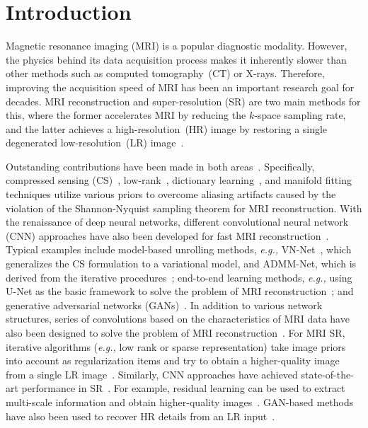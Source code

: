 \documentclass[runningheads]{llncs}
\newcommand{\eg}[1]{\textit{e.g.,}}
\begin{document}
\section{Introduction}
Magnetic resonance imaging (MRI) is a popular diagnostic modality. However, the physics behind its data acquisition process makes it inherently slower than other methods such as computed tomography\!~(CT) or X-rays. Therefore, improving the acquisition speed of MRI has been an important research goal for decades. MRI reconstruction and super-resolution (SR) are two main methods for this, where the former accelerates MRI by reducing the $k$-space sampling rate, and the latter achieves a high-resolution\!~(HR) image by restoring a single degenerated low-resolution\!~(LR) image~\cite{feng2021brain}.

Outstanding contributions have been made in both areas~\cite{feng2021MINet,feng2021DONet,feng2021accelerated}. Specifically, compressed sensing (CS)~\cite{lai2016image}, low-rank~\cite{shin2014calibrationless}, dictionary learning~\cite{ravishankar2010mr,zhan2015fast}, 
and manifold fitting~\cite{nakarmi2017kernel} techniques utilize various priors to overcome aliasing artifacts caused by the violation of the Shannon-Nyquist sampling theorem for MRI reconstruction. With the renaissance of deep neural networks, different convolutional neural network (CNN) approaches have also been developed for fast MRI reconstruction~\cite{zhu2018image,feng2021DualOctConv}. Typical examples include model-based unrolling methods, \eg, VN-Net~\cite{hammernik2018learning}, which generalizes the CS formulation to a variational model, and ADMM-Net, which is derived from the iterative procedures~\cite{yang2016deep}; end-to-end learning methods, \eg, using U-Net as the basic framework to solve the problem of MRI reconstruction~\cite{qin2018convolutional,huang2019mri}; and generative adversarial networks (GANs)~\cite{yang2017dagan,mardani2018deep}. In addition to various network structures, series of convolutions based on the characteristics of MRI data have also been designed to solve the problem of MRI reconstruction~\cite{feng2021DualOctConv,wang2020deepcomplexmri}. For MRI SR, iterative algorithms (\eg, low rank or sparse representation) take image priors into account  as regularization items and try to obtain a higher-quality image from a single LR image~\cite{wang2014sparse,zhang2007application}.
Similarly, CNN approaches have achieved state-of-the-art
performance in SR~\cite{chaudhari2018super,lyu2019super}. For example, residual learning can be used to extract multi-scale information and obtain higher-quality images~\cite{shi2018super,oktay2016multi}. GAN-based methods have also been used to recover HR details from an LR input~\cite{chen2018efficient,mahapatra2019image}. 
\end{document}
